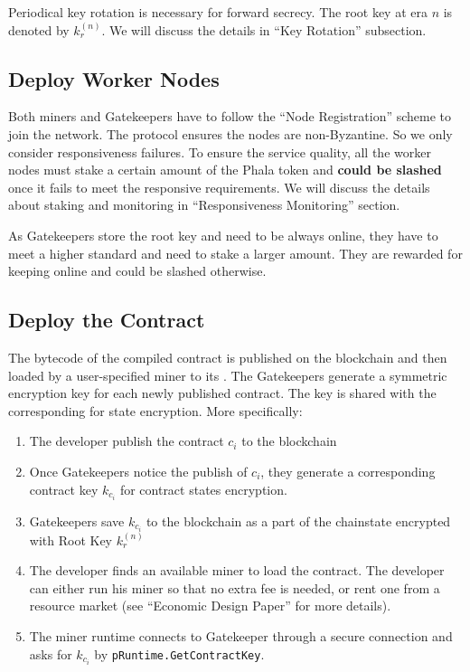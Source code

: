 Periodical key rotation is necessary for forward secrecy. The root key at era $n$ is denoted by $k_r^{(n)}$. We will discuss the details in ``Key Rotation'' subsection.



\subsection{Deploy Worker Nodes}

Both miners and Gatekeepers have to follow the ``Node Registration'' scheme to join the network. The protocol ensures the nodes are non-Byzantine. So we only consider responsiveness failures. To ensure the service quality, all the worker nodes must stake a certain amount of the Phala token and \textbf{could be slashed} once it fails to meet the responsive requirements. We will discuss the details about staking and monitoring in ``Responsiveness Monitoring'' section.

As Gatekeepers store the root key and need to be always online, they have to meet a higher standard and need to stake a larger amount. They are rewarded for keeping online and could be slashed otherwise.



\subsection{Deploy the Contract}

The bytecode of the compiled contract is published on the blockchain and then loaded by a user-specified miner to its \pruntime. The Gatekeepers generate a symmetric encryption key for each newly published contract. The key is shared with the corresponding \pruntime for state encryption. More specifically:

\begin{enumerate}
    \item The developer publish the contract $c_i$ to the blockchain
    \item Once Gatekeepers notice the publish of $c_i$, they generate a corresponding contract key $k_{c_i}$ for contract states encryption.
    \item Gatekeepers save $k_{c_i}$ to the blockchain as a part of the chainstate encrypted with Root Key $k_r^{(n)}$
    \item The developer finds an available miner to load the contract. The developer can either run his miner so that no extra fee is needed, or rent one from a resource market (see ``Economic Design Paper'' for more details).
    \item The miner runtime connects to Gatekeeper through a secure connection and asks for $k_{c_i}$ by \texttt{pRuntime.GetContractKey}.
\end{enumerate}

